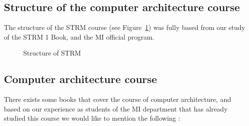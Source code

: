 \subsection{Structure of the computer architecture course}
The structure of the STRM course (see Figure~\ref{fig:STRM}) was fully based from our study of the STRM 1 Book\cite{STRM-1-Book-Taha-Zerrouki}, and the MI official program\cite{prog-MI}.

\begin{figure} [h!]%
 	\vspace*{13pt}
 	\vspace*{13pt}               
 	\caption{Structure of STRM} 
 	\label{fig:STRM}
 \end{figure} 

 \subsection{Computer architecture course}
 There exists some books that cover the course of computer architecture, and based on our experience as students of the MI department that has already studied this course 
 we would like to mention the following :
